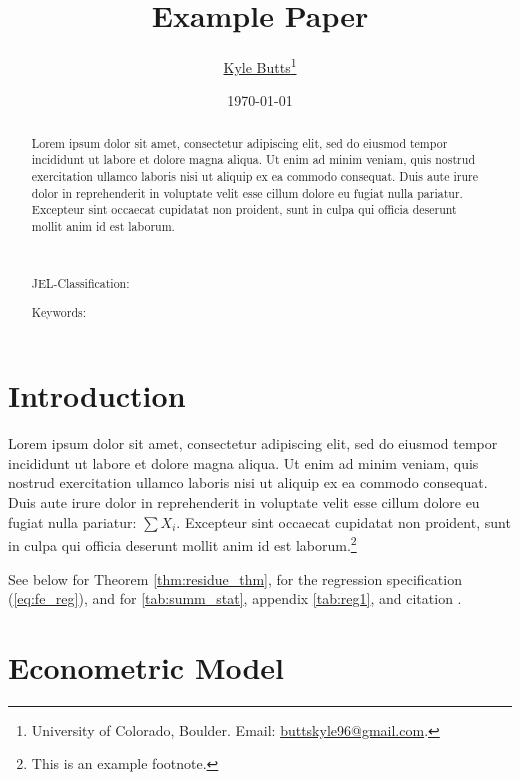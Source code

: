 \documentclass[12pt]{article}
\title{Example Paper}
\author{
    \href{https://kylebutts.com/}{Kyle Butts}\thanks{University of Colorado, Boulder. Email: \href{mailto:buttskyle96@gmail.com}{buttskyle96@gmail.com}.} %
}
\date{\today}
\begin{document}
\maketitle
\begin{abstract}
    Lorem ipsum dolor sit amet, consectetur adipiscing elit, sed do eiusmod tempor incididunt ut labore et dolore magna aliqua. Ut enim ad minim veniam, quis nostrud exercitation ullamco laboris nisi ut aliquip ex ea commodo consequat. Duis aute irure dolor in reprehenderit in voluptate velit esse cillum dolore eu fugiat nulla pariatur. Excepteur sint occaecat cupidatat non proident, sunt in culpa qui officia deserunt mollit anim id est laborum.

    \par~\par\noindent
    JEL-Classification: 
    \par\noindent
    Keywords: 
    \par
\end{abstract}

\newpage



\section{Introduction}

Lorem ipsum dolor sit amet, consectetur adipiscing elit, sed do eiusmod tempor incididunt ut labore et dolore magna aliqua. Ut enim ad minim veniam, quis nostrud exercitation ullamco laboris nisi ut aliquip ex ea commodo consequat. Duis aute irure dolor in reprehenderit in voluptate velit esse cillum dolore eu fugiat nulla pariatur: $\sum X_i$. Excepteur sint occaecat cupidatat non proident, sunt in culpa qui officia deserunt mollit anim id est laborum.\footnote{This is an example footnote.}

See below for Theorem \ref{thm:residue_thm}, for the regression specification (\ref{eq:fe_reg}), and for \autoref{tab:summ_stat}, appendix \autoref{tab:reg1}, and citation \citet{Eigen1971}.

\section{Econometric Model}
\end{document}
